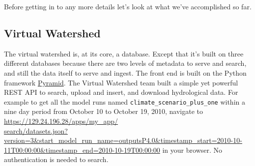 \documentclass[
11pt, %
a4paper, %
oneside, %
twoside, %
headinclude,footinclude, %
BCOR5mm, %
]{scrartcl}
\begin{document}
Before getting in to any more details let's look at what we've accomplished so far.

\subsection{Virtual Watershed} %
\label{sub:vw}

The virtual watershed is, at its core, a database. Except that it's built on three different
databases because there are two levels of metadata to serve and search, and still the data itself
to serve and ingest. The front end is built on the Python framework \href{http://www.pylonsproject.org/}{Pyramid}.
The Virtual Watershed team built a simple yet powerful REST API to search, upload and insert, and download
hydrological data. For example to get all the model runs named \texttt{climate\_scenario\_plus\_one} within
a nine day period from October 10 to October 19, 2010, 
navigate to 
\href{https://129.24.196.28/apps/my\_app/search/datasets.json?version=3\&start\_model\_run\_name=outputsP4.0\&timestamp\_start=2010-10-11T00:00:00\&timestamp\_end=2010-10-19T00:00:00}{https://129.24.196.28/apps/my\_app/\\search/datasets.json?version=3\&start\_model\_run\_name=outputsP4.0\&timestamp\_start=2010-10-11T00:00:00\&timestamp\_end=2010-10-19T00:00:00} 
in your browser. No authentication is needed to search.
\end{document}
